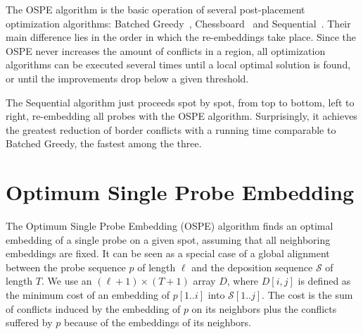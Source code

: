 \documentclass{llncs}
\newcommand{\ignore}[1]{}
\begin{document}
The OSPE algorithm is the basic operation of several post-placement
optimization algorithms: Batched Greedy~\cite{KAHNG02},
Chessboard~\cite{KAHNG02} and Sequential~\cite{KAHNG03B}. Their main
difference lies in the order in which the re-embeddings take place.
Since the OSPE never increases the amount of conflicts in a region, all
optimization algorithms can be executed several times until a local
optimal solution is found, or until the improvements drop below a given
threshold.

\ignore{ The first algorithm is a simple greedy approach that computes, for
  each spot of the chip, the maximum reduction of conflicts that could be
  achieved by re-embedding its probe with the OSPE algorithm. It then greedily
  selects the spot with higher gain and re-embeds its probe optimally with
  respect to its neighbors, updating the gains of affected spots. A faster
  version, called Batched Greedy, sacrifices its greedy nature by postponing
  the update of gains and re-embedding all probes that have not been affected
  by the re-embeddings performed in the current iteration.
  
  The Chessboard optimization is based on the fact that a chip can be
  bi-colored just like a chessboard, in such a way that the embeddings of
  probes located on white spots, with respect to border length, are
  independent of those placed on black spots, and vice-versa. The Chessboard
  uses this coloring to alternate the optimal re-embedding of probes located
  on black and white spots.%
}

The Sequential algorithm just proceeds spot by spot, from top to
bottom, left to right, re-embedding all probes with the OSPE algorithm.
Surprisingly, it achieves the greatest reduction of border conflicts with a
running time comparable to Batched Greedy, the fastest among the three.


\section{Optimum Single Probe Embedding}
\label{sec:ospe}

The Optimum Single Probe Embedding (OSPE) algorithm finds an optimal
embedding of a single probe on a given spot, assuming that all neighboring
embeddings are fixed. It can be seen as a special case of a global alignment
between the probe sequence $p$ of length $\ell$ and the deposition sequence
$\mathcal{S}$ of length $T$. We use an $(\ell + 1) \times (T + 1)$ array
$D$, where $D[i,j]$ is defined as the minimum cost of an embedding of
$p[1..i]$ into $\mathcal{S}[1..j]$.  The cost is the sum of conflicts induced
by the embedding of $p$ on its neighbors plus the conflicts suffered by $p$
because of the embeddings of its neighbors.
\end{document}
